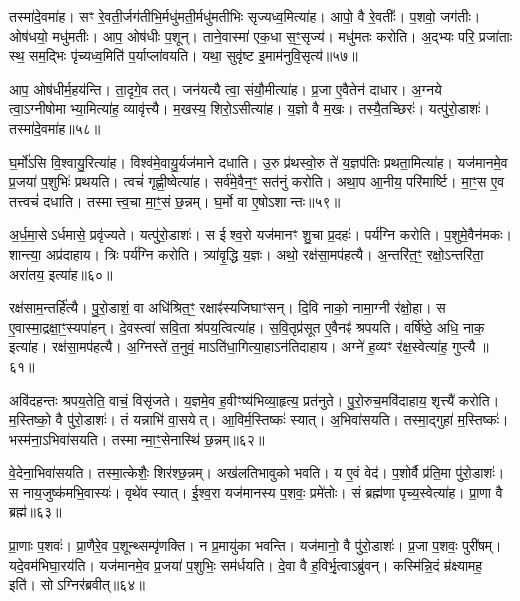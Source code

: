 तस्मा॑दे॒वमा॑ह।
सꣳ रे॒वती॒र्जग॑तीभि॒र्मधु॑मती॒र्मधु॑मतीभिः सृज्यध्व॒मित्या॑ह।
आपो॒ वै रे॒वतीः᳚।
प॒शवो॒ जग॑तीः।
ओष॑धयो॒ मधु॑मतीः।
आप॒ ओष॑धीः प॒शून्।
ताने॒वास्मा॑ एक॒धा स॒ꣳ॒सृज्य॑।
मधु॑मतः करोति।
अ॒द्भ्यः परि॒ प्रजा॑ताः स्थ॒ सम॒द्भिः पृ॑च्यध्व॒मिति॑ प॒र्याप्ला॑वयति।
यथा॒ सुवृ॑ष्ट इ॒माम॑नुवि॒सृत्य॑॥५७॥

आप॒ ओष॑धीर्म॒हय॑न्ति।
ता॒दृगे॒व तत्।
जन॑यत्यै त्वा॒ संयौ॒मीत्या॑ह।
प्र॒जा ए॒वैतेन॑ दाधार।
अ॒ग्नये त्वा॒\-ऽग्नीषोमाभ्या॒मित्या॑ह॒ व्यावृ॑त्त्यै।
म॒खस्य॒ शिरो॒\-ऽसीत्या॑ह।
य॒ज्ञो वै म॒खः।
तस्यै॒तच्छिरः॑।
यत्पु॑रो॒डाशः॑।
तस्मा॑दे॒वमा॑ह॥५८॥

घ॒र्मो॑ऽसि वि॒श्वायु॒रित्या॑ह।
विश्व॑मे॒वायु॒र्यज॑माने दधाति।
उ॒रु प्र॑थस्वो॒रु ते॑ य॒ज्ञप॑तिः प्रथता॒मित्या॑ह।
यज॑मानमे॒व प्र॒जया॑ प॒शुभिः॑ प्रथयति।
त्वचं॑ गृह्णी॒ष्वेत्या॑ह।
सर्व॑मे॒वैन॒ꣳ॒ सत॑नुं करोति।
अथा॒प आ॒नीय॒ परि॑मार्ष्टि।
मा॒ꣳ॒स ए॒व तत्त्वचं॑ दधाति।
तस्मात्त्व॒चा मा॒ꣳ॒सं छ॒न्नम्।
घ॒र्मो वा ए॒षो\-ऽशान्तः॥५९॥

अ॒र्ध॒मा॒से\-ऽर्धमासे॒ प्रवृ॑ज्यते।
यत्पु॑रो॒डाशः॑।
स ई\hspace{0.4ex}\hspace{-0.4ex}श्व॒रो यज॑मानꣳ शु॒चा प्र॒दहः॑।
पर्य॑ग्नि करोति।
प॒शुमे॒वैन॑मकः।
शान्त्या॒ अप्र॑दाहाय।
त्रिः पर्य॑ग्नि करोति।
त्र्या॑वृ॒द्धि य॒ज्ञः।
अथो॒ रक्ष॑सा॒मप॑हत्यै।
अ॒न्तरि॑त॒ꣳ॒ रक्षो॒\-ऽन्तरि॑ता॒ अरा॑तय॒ इत्या॑ह॥६०॥

रक्ष॑साम॒न्तर्\mbox{}हि॑त्यै।
पु॒रो॒डाशं॒ वा अधि॑श्रित॒ꣳ॒ रक्षाꣴ॑स्य\-जिघाꣳसन्।
दि॒वि नाको॒ नामा॒ग्नी र॑क्षो॒हा।
स ए॒वास्मा॒द्रक्षा॒ꣳ॒स्यपा॑हन्।
दे॒वस्त्वा॑ सवि॒ता श्र॑पय॒त्वित्या॑ह।
स॒वि॒तृप्र॑सूत ए॒वैनꣴ॑ श्रपयति।
वर्\mbox{}षि॑ष्ठे॒ अधि॒ नाक॒ इत्या॑ह।
रक्ष॑सा॒मप॑हत्यै।
अ॒ग्निस्ते॑ त॒नुवं॒ माऽति॑धा॒गित्या॒हा\-ऽन॑तिदाहाय।
अग्ने॑ ह॒व्यꣳ र॑क्ष॒स्वेत्या॑ह॒ गुप्त्यै॥६१॥

अवि॑दहन्तः श्रपय॒तेति॒ वाचं॒ विसृ॑जते।
य॒ज्ञमे॒व ह॒वीꣳष्य॑भिव्या॒हृत्य॒ प्रत॑नुते।
पु॒रो॒रुच॒मवि॑दाहाय॒ शृत्त्यै॑ करोति।
म॒स्तिष्को॒ वै पु॑रो॒डाशः॑।
तं यन्नाभि॑ वा॒सयेत्।
आ॒विर्म॒स्तिष्कः॑ स्यात्।
अ॒भिवा॑सयति।
तस्मा॒द्गुहा॑ म॒स्तिष्कः॑।
भस्म॑ना॒\-ऽभिवा॑सयति।
तस्मान्मा॒ꣳ॒सेनास्थि॑ छ॒न्नम्॥६२॥

वे॒देना॒भिवा॑सयति।
तस्मा॒त्केशैः॒ शिर॑श्छ॒न्नम्।
अख॑लतिभावुको भवति।
य ए॒वं वेद॑।
प॒शोर्वै प्र॑ति॒मा पु॑रो॒डाशः॑।
स नाय॒जुष्क॑मभि॒वास्यः॑।
वृथे॑व स्यात्।
ई॒श्व॒रा यज॑मानस्य प॒शवः॒ प्रमे॑तोः।
सं ब्रह्म॑णा पृच्य॒स्वेत्या॑ह।
प्रा॒णा वै ब्रह्म॑॥६३॥

प्रा॒णाः प॒शवः॑।
प्रा॒णैरे॒व प॒शून्थ्सम्पृ॑णक्ति।
न प्र॒मायु॑का भवन्ति।
यज॑मानो॒ वै पु॑रो॒डाशः॑।
प्र॒जा प॒शवः॒ पुरी॑षम्।
यदे॒वम॑भिघा॒रय॑ति।
यज॑मानमे॒व प्र॒जया॑ प॒शुभिः॒ सम॑र्धयति।
दे॒वा वै ह॒विर्भृ॒त्वा\-ऽब्रु॑वन्।
कस्मि॑न्नि॒दं म्र॑क्ष्यामह॒ इति॑।
सोऽग्निर॑ब्रवीत्॥६४॥

